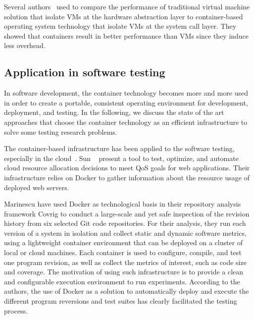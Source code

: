 Several authors~\cite{spoiala2016performance,soltesz2007container,merkel2014docker,felter2015updated} used to compare the performance of traditional virtual machine solution that isolate VMs at the hardware abstraction layer to container-based operating system technology that isolate VMs at the system call layer. They showed that containers result in better performance than VMs since they induce less overhead. 


\subsection{Application in software testing}  
In software development, the container technology becomes more and more used in order to create a portable, consistent operating environment for development, deployment, and testing.
In the following, we discuss the state of the art approaches that choose the container technology as an efficient infrastructure to solve some testing research problems. 

The container-based infrastructure has been applied to the software testing, especially in the cloud~\cite{li2015rest}. Sun \etal~\cite{sun2016roar} present a tool to test, optimize, and automate cloud resource allocation decisions to meet QoS goals for web applications. Their infrastructure relies on Docker to gather information about the resource usage of deployed web servers. 

Marinescu \etal\cite{marinescu2014covrig} have used Docker as technological basis in their repository analysis framework Covrig to conduct a large-scale and yet safe inspection of the revision history from six selected Git code repositories. 
For their analysis, they run each version of a system in isolation and collect static and dynamic software metrics, using a lightweight container environment that can be deployed on a cluster of local or cloud machines. Each container is used to configure, compile, and test one program revision, as well as collect the metrics of interest, such as code size and coverage.
The motivation of using such infrastructure is to provide a clean and configurable execution environment to run experiments. According to the authors, the use of Docker as a solution to automatically deploy and execute the different program reversions and test suites has clearly facilitated the testing process.


